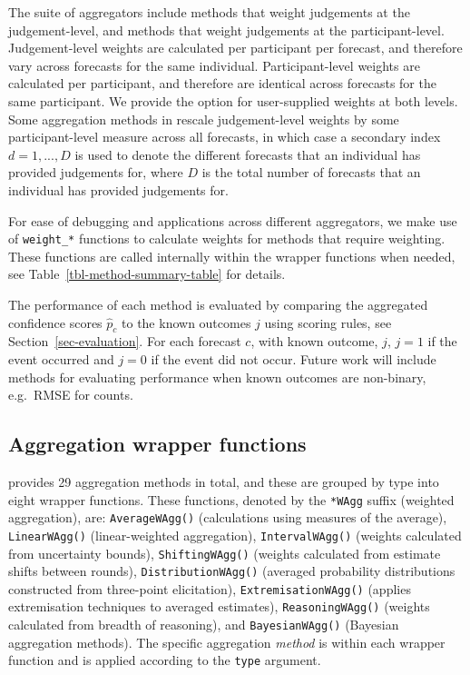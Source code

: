 \documentclass[
  11pt,
  a4paper,
]{article}
\begin{document}
The suite of aggregators include methods that weight judgements at the
judgement-level, and methods that weight judgements at the
participant-level. Judgement-level weights are calculated per
participant per forecast, and therefore vary across forecasts for the
same individual. Participant-level weights are calculated per
participant, and therefore are identical across forecasts for the same
participant. We provide the option for user-supplied weights at both
levels. Some aggregation methods in  rescale
judgement-level weights by some participant-level measure across all
forecasts, in which case a secondary index \(d = 1, ..., D\) is used to
denote the different forecasts that an individual has provided
judgements for, where \(D\) is the total number of forecasts that an
individual has provided judgements for.

For ease of debugging and applications across different aggregators, we
make use of \texttt{weight\_*} functions to calculate weights for
methods that require weighting. These functions are called internally
within the wrapper functions when needed, see
Table~\ref{tbl-method-summary-table} for details.

The performance of each method is evaluated by comparing the aggregated
confidence scores \(\hat{p}_c\) to the known outcomes \(j\) using
scoring rules, see Section~\ref{sec-evaluation}. For each forecast
\(c\), with known outcome, \(j\), \(j = 1\) if the event occurred and
\(j = 0\) if the event did not occur. Future work will include methods
for evaluating performance when known outcomes are non-binary, e.g.~RMSE
for counts.

\subsection{Aggregation wrapper
functions}\label{aggregation-wrapper-functions}

 provides 29 aggregation methods in total, and these are
grouped by type into eight wrapper functions. These functions, denoted
by the \texttt{*WAgg} suffix (weighted aggregation), are:
\texttt{AverageWAgg()} (calculations using measures of the average),
\texttt{LinearWAgg()} (linear-weighted aggregation),
\texttt{IntervalWAgg()} (weights calculated from uncertainty bounds),
\texttt{ShiftingWAgg()} (weights calculated from estimate shifts between
rounds), \texttt{DistributionWAgg()} (averaged probability distributions
constructed from three-point elicitation), \texttt{ExtremisationWAgg()}
(applies extremisation techniques to averaged estimates),
\texttt{ReasoningWAgg()} (weights calculated from breadth of reasoning),
and \texttt{BayesianWAgg()} (Bayesian aggregation methods). The specific
aggregation \emph{method} is within each wrapper function and is applied
according to the \texttt{type} argument.
\end{document}
